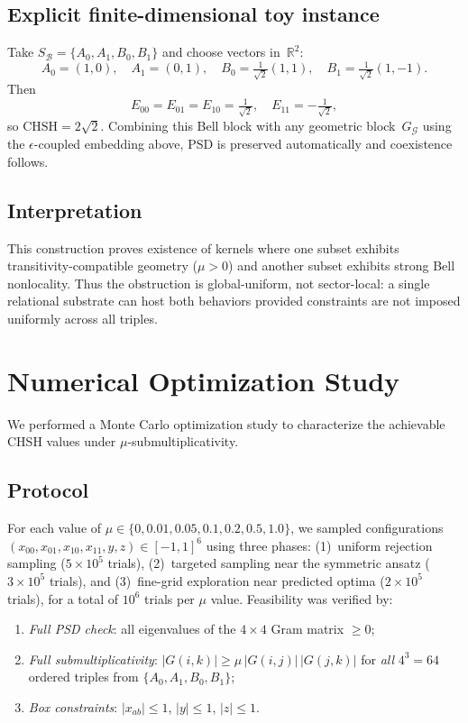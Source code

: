 \documentclass[11pt,a4paper]{article}
\theoremstyle{definition}
\theoremstyle{remark}
\newcommand{\CHSH}{\mathrm{CHSH}}
\begin{document}
\subsection{Explicit finite-dimensional toy instance}

Take $S_{\mathcal{B}} = \{A_0, A_1, B_0, B_1\}$ and choose vectors in~$\mathbb{R}^2$:
\[
A_0 = (1,0), \quad A_1 = (0,1), \quad B_0 = \tfrac{1}{\sqrt{2}}(1,1), \quad B_1 = \tfrac{1}{\sqrt{2}}(1,-1).
\]
Then
\[
E_{00} = E_{01} = E_{10} = \tfrac{1}{\sqrt{2}}, \quad E_{11} = -\tfrac{1}{\sqrt{2}},
\]
so $\CHSH = 2\sqrt{2}$. Combining this Bell block with any geometric block~$G_{\mathcal{G}}$ using the $\epsilon$-coupled embedding above, PSD is preserved automatically and coexistence follows.

\subsection{Interpretation}

This construction proves existence of kernels where one subset exhibits transitivity-compatible geometry ($\mu > 0$) and another subset exhibits strong Bell nonlocality. Thus the obstruction is global-uniform, not sector-local: a single relational substrate can host both behaviors provided constraints are not imposed uniformly across all triples.


\section{Numerical Optimization Study}\label{app:numerics}

We performed a Monte Carlo optimization study to characterize the achievable CHSH values under $\mu$-submultiplicativity.

\subsection{Protocol}

For each value of $\mu \in \{0, 0.01, 0.05, 0.1, 0.2, 0.5, 1.0\}$, we sampled configurations $(x_{00}, x_{01}, x_{10}, x_{11}, y, z) \in [-1,1]^6$ using three phases: (1)~uniform rejection sampling ($5 \times 10^5$ trials), (2)~targeted sampling near the symmetric ansatz ($3 \times 10^5$ trials), and (3)~fine-grid exploration near predicted optima ($2 \times 10^5$ trials), for a total of $10^6$ trials per $\mu$ value. Feasibility was verified by:
\begin{enumerate}[nosep]
  \item \emph{Full PSD check}: all eigenvalues of the $4 \times 4$ Gram matrix $\ge 0$;
  \item \emph{Full submultiplicativity}: $|G(i,k)| \ge \mu\,|G(i,j)|\,|G(j,k)|$ for \emph{all} $4^3 = 64$ ordered triples from $\{A_0,A_1,B_0,B_1\}$;
  \item \emph{Box constraints}: $|x_{ab}| \le 1$, $|y| \le 1$, $|z| \le 1$.
\end{enumerate}
\end{document}
